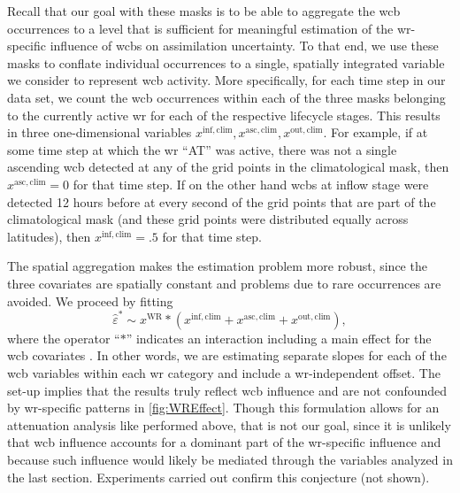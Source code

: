 Recall that our goal with these masks is to be able to aggregate the \gls{wcb} occurrences to a level that is sufficient for meaningful estimation of the \gls{wr}-specific influence of \glspl{wcb} on assimilation uncertainty. To that end, we use these masks to conflate individual occurrences to a single, spatially integrated variable we consider to represent \gls{wcb} activity. More specifically, for each time step in our data set, we count the \gls{wcb} occurrences within each of the three masks belonging to the currently active \gls{wr} for each of the respective lifecycle stages. This results in three one-dimensional variables $x^{\mathrm{inf,clim}}, x^{\mathrm{asc,clim}}, x^{\mathrm{out,clim}}$. For example, if at some time step at which the \gls{wr} \enquote{AT} was active, there was not a single ascending \gls{wcb} detected at any of the grid points in the climatological mask, then $x^{\mathrm{asc,clim}} = 0$ for that time step. If on the other hand \glspl{wcb} at inflow stage were detected 12 hours before at every second of the grid points that are part of the climatological mask (and these grid points were distributed equally across latitudes), then $x^{\mathrm{inf,clim}}=.5$ for that time step.

The spatial aggregation makes the estimation problem more robust, since the three covariates are spatially constant and problems due to rare occurrences are avoided. We proceed by fitting
\begin{equation}
    \label{eq:WRWCB}
    \hat{\varepsilon}^{\ast}\sim x^{\mathrm{WR}} * \left(x^{\mathrm{inf,clim}} + x^{\mathrm{asc,clim}}+ x^{\mathrm{out,clim}}\right),
\end{equation}
where the operator \enquote{$*$} indicates an interaction including a main effect for the \gls{wcb} covariates \parencite{pinheiroMixedeffectsModelsSPLUS2000}. In other words, we are estimating separate slopes for each of the \gls{wcb} variables within each \gls{wr} category and include a \gls{wr}-independent offset. The set-up implies that the results truly reflect \gls{wcb} influence and are not confounded by \gls{wr}-specific patterns in \cref{fig:WREffect}. Though this formulation allows for an attenuation analysis like performed above, that is not our goal, since it is unlikely that \gls{wcb} influence accounts for a dominant part of the \gls{wr}-specific influence and because such influence would likely be mediated through the variables analyzed in the last section. Experiments carried out confirm this conjecture (not shown).

